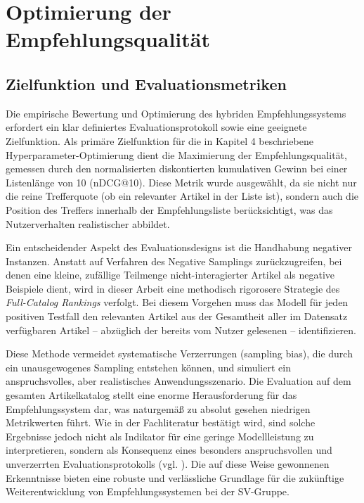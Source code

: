 \section{Optimierung der Empfehlungsqualität}

\subsection{Zielfunktion und Evaluationsmetriken}
\label{sec:metrics}
Die empirische Bewertung und Optimierung des hybriden Empfehlungssystems erfordert ein klar definiertes 
Evaluationsprotokoll sowie eine geeignete Zielfunktion. Als primäre Zielfunktion für die in Kapitel 4 
beschriebene Hyperparameter-Optimierung dient die Maximierung der Empfehlungsqualität, gemessen durch 
den normalisierten diskontierten kumulativen Gewinn bei einer Listenlänge von 10 (nDCG@10). Diese Metrik 
wurde ausgewählt, da sie nicht nur die reine Trefferquote (ob ein relevanter Artikel in der Liste ist), 
sondern auch die Position des Treffers innerhalb der Empfehlungsliste berücksichtigt, was das 
Nutzerverhalten realistischer abbildet.

Ein entscheidender Aspekt des Evaluationsdesigns ist die Handhabung negativer Instanzen. Anstatt auf 
Verfahren des Negative Samplings zurückzugreifen, bei denen eine kleine, zufällige Teilmenge 
nicht-interagierter Artikel als negative Beispiele dient, wird in dieser Arbeit eine 
methodisch rigorosere Strategie des \textit{Full-Catalog Rankings} verfolgt. Bei diesem Vorgehen muss 
das Modell für jeden positiven Testfall den relevanten Artikel aus der Gesamtheit aller im 
Datensatz verfügbaren Artikel – abzüglich der bereits vom Nutzer gelesenen – identifizieren.

Diese Methode vermeidet systematische Verzerrungen (sampling bias), die durch ein 
unausgewogenes Sampling entstehen können, und simuliert ein anspruchsvolles, aber realistisches 
Anwendungsszenario. Die Evaluation auf dem gesamten Artikelkatalog stellt eine enorme 
Herausforderung für das Empfehlungssystem dar, was naturgemäß zu absolut gesehen niedrigen 
Metrikwerten führt. Wie in der Fachliteratur bestätigt wird, sind solche Ergebnisse jedoch nicht 
als Indikator für eine geringe Modellleistung zu interpretieren, sondern als Konsequenz eines 
besonders anspruchsvollen und unverzerrten Evaluationsprotokolls 
(vgl. \cite{krichene_sampled_2020}). Die auf diese Weise gewonnenen Erkenntnisse bieten eine 
robuste und verlässliche Grundlage für die zukünftige Weiterentwicklung von 
Empfehlungssystemen bei der SV-Gruppe.

